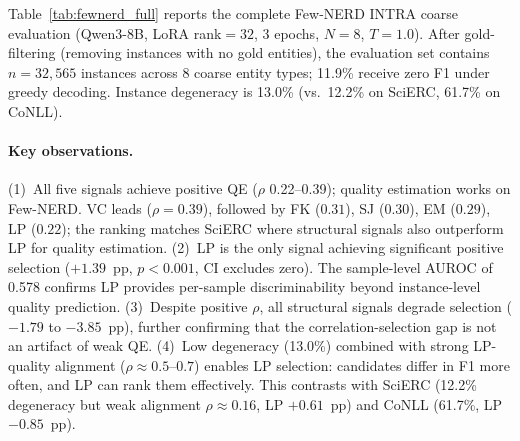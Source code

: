 Table~\ref{tab:fewnerd_full} reports the complete Few-NERD INTRA coarse evaluation (Qwen3-8B, LoRA rank${=}32$, 3 epochs, $N{=}8$, $T{=}1.0$).
After gold-filtering (removing instances with no gold entities), the evaluation set contains $n{=}32{,}565$ instances across 8 coarse entity types; 11.9\% receive zero F1 under greedy decoding.
Instance degeneracy is 13.0\% (vs.\ 12.2\% on SciERC, 61.7\% on CoNLL).

\begin{table}[t]
\centering
\small
\caption{Few-NERD INTRA coarse: complete quality estimation and selection results (Qwen3-8B, $N{=}8$, $T{=}1.0$, gold-filtered $n{=}32{,}565$). $\rho$: Spearman correlation with instance F1. Sample AUROC: per-sample LP discrimination. Sel.\ $\Delta$: selection F1 minus greedy (0.748). CI: bootstrap 95\% confidence interval.}
\label{tab:fewnerd_full}
\end{table}

\paragraph{Key observations.}
(1)~All five signals achieve positive QE ($\rho$ 0.22--0.39); quality estimation works on Few-NERD. VC leads ($\rho{=}0.39$), followed by FK ($0.31$), SJ ($0.30$), EM ($0.29$), LP ($0.22$); the ranking matches SciERC where structural signals also outperform LP for quality estimation.
(2)~LP is the only signal achieving significant positive selection ($+1.39$~pp, $p{<}0.001$, CI excludes zero). The sample-level AUROC of 0.578 confirms LP provides per-sample discriminability beyond instance-level quality prediction.
(3)~Despite positive $\rho$, all structural signals degrade selection ($-1.79$ to $-3.85$~pp), further confirming that the correlation-selection gap is not an artifact of weak QE.
(4)~Low degeneracy (13.0\%) combined with strong LP-quality alignment ($\rho{\approx}0.5$--$0.7$) enables LP selection: candidates differ in F1 more often, and LP can rank them effectively. This contrasts with SciERC (12.2\% degeneracy but weak alignment $\rho{\approx}0.16$, LP $+0.61$~pp) and CoNLL (61.7\%, LP $-0.85$~pp).

